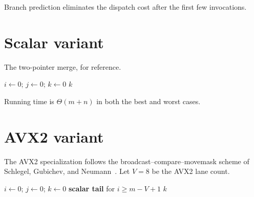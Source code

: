 \documentclass[11pt,openany]{book}
\begin{document}
Branch prediction eliminates the dispatch cost after the first few
invocations.

\section{Scalar variant}
\label{sec:simd:scalar}

The two-pointer merge, for reference.

\begin{algorithm}[H]
\caption{\textsc{Intersect-Scalar}$(A, B, \mathit{out})$}
\label{alg:simd:scalar}
\Input{sorted arrays $A[0 \mathinner{\ldotp\ldotp} m)$, $B[0 \mathinner{\ldotp\ldotp} n)$}
\Output{count $k = \abs{A \cap B}$; $\mathit{out}[0 \mathinner{\ldotp\ldotp} k)$ holds the intersection}
$i \gets 0$; $j \gets 0$; $k \gets 0$\;
\KwReturn $k$\;
\end{algorithm}

Running time is $\Theta(m + n)$ in both the best and worst cases.

\section{AVX2 variant}
\label{sec:simd:avx2}

The AVX2 specialization follows the broadcast--compare--movemask
scheme of Schlegel, Gubichev, and Neumann~\cite{schlegel}. Let
$V = 8$ be the AVX2 lane count.

\begin{algorithm}[H]
\caption{\textsc{Intersect-Avx2}$(A, B, \mathit{out})$}
\label{alg:simd:avx2}
\Input{sorted arrays $A[0 \mathinner{\ldotp\ldotp} m)$, $B[0 \mathinner{\ldotp\ldotp} n)$, with strictly increasing values}
\Output{count $k$; $\mathit{out}[0 \mathinner{\ldotp\ldotp} k)$ holds the intersection}
$i \gets 0$; $j \gets 0$; $k \gets 0$\;
\textbf{scalar tail} for $i \ge m - V + 1$ \;
\KwReturn $k$\;
\end{algorithm}
\end{document}
